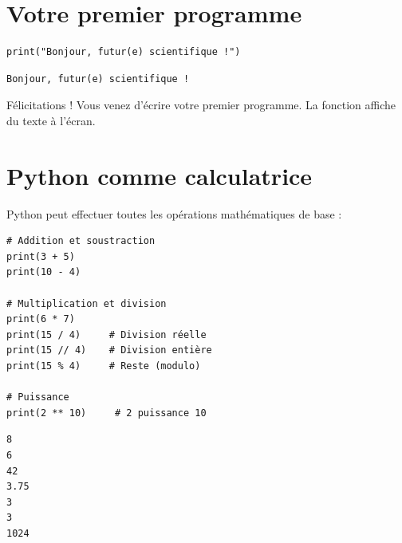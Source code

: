 \section{Votre premier programme}

\begin{codeblock}[title=\textbf{Python}]
\begin{verbatim}
print("Bonjour, futur(e) scientifique !")
\end{verbatim}
\end{codeblock}

\begin{codeoutput}
\begin{verbatim}
Bonjour, futur(e) scientifique !
\end{verbatim}
\end{codeoutput}

F\'elicitations ! Vous venez d'\'ecrire votre premier programme. La fonction  affiche du texte \`a l'\'ecran.

\section{Python comme calculatrice}

Python peut effectuer toutes les op\'erations math\'ematiques de base :

\begin{codeblock}[title=\textbf{Python --- Calculs de base}]
\begin{verbatim}
# Addition et soustraction
print(3 + 5)
print(10 - 4)

# Multiplication et division
print(6 * 7)
print(15 / 4)     # Division réelle
print(15 // 4)    # Division entière
print(15 % 4)     # Reste (modulo)

# Puissance
print(2 ** 10)     # 2 puissance 10
\end{verbatim}
\end{codeblock}

\begin{codeoutput}
\begin{verbatim}
8
6
42
3.75
3
3
1024
\end{verbatim}
\end{codeoutput}

